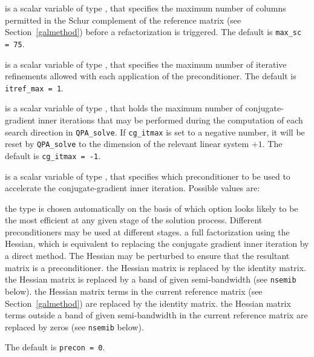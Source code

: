 \begin{description}
 is a scalar variable of type \integer, that specifies
the maximum number of columns permitted in the Schur complement of the
reference matrix (see Section~\ref{galmethod})
before a refactorization is triggered.
The default is {\tt max\_sc = 75}.



 is a scalar variable of type \integer, that specifies
the maximum number of iterative refinements allowed with each application
of the preconditioner.
The default is {\tt itref\_max = 1}.

 is a scalar variable of type \integer, that holds the
maximum number of conjugate-gradient inner iterations that may be performed
during the computation of each search direction in {\tt QPA\_solve}.
If {\tt cg\_itmax} is set to a negative number, it will be reset by
{\tt QPA\_solve} to the dimension of the relevant linear system $+ 1$.
The default is {\tt cg\_itmax = -1}.

 is a scalar variable of type \integer, that specifies
which preconditioner to be used to accelerate the conjugate-gradient
inner iteration.  Possible values are:

\begin{description}
 the type is chosen automatically on the basis of which option looks
        likely to be the most efficient at any given stage of the solution
        process. Different preconditioners may be used at different stages.
  a full factorization using the Hessian, which is equivalent to
        replacing the conjugate gradient inner iteration by a direct method.
        The Hessian may be perturbed to ensure that the resultant matrix
        is a preconditioner.
 the Hessian matrix is replaced by the identity matrix.
 the Hessian matrix is replaced by a band of given semi-bandwidth
        (see {\tt nsemib} below).
  the Hessian matrix terms in the current reference matrix
        (see Section~\ref{galmethod}) are replaced by the identity matrix.
  the Hessian matrix terms outside a band of given semi-bandwidth
        in the current reference matrix are replaced by zeros
        (see {\tt nsemib} below).
\end{description}
The default is {\tt precon = 0}.


\end{description}
